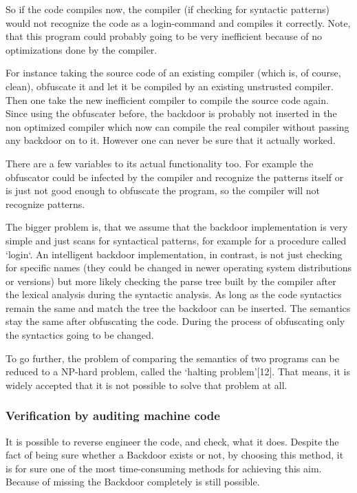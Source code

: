 \documentclass[a4paper, 12pt]{article}
\begin{document}
So if the code compiles now, the compiler (if checking for syntactic patterns) would not recognize the code as a login-command and compiles it correctly. Note, that this program could probably going to be very inefficient because of no optimizations done by the compiler.

For instance taking the source code of an existing compiler (which is, of course, clean), obfuscate it and let it be compiled by an existing unstrusted compiler.
Then one take the new inefficient compiler to compile the source code again. Since using the obfuscater before, the backdoor is probably not inserted in the non optimized compiler which now can compile the real compiler without passing any backdoor on to it.
However one can never be sure that it actually worked.

There are a few variables to its actual functionality too. For example the obfuscator could be infected by the compiler and recognize the patterns itself or is just not good enough to obfuscate the program, so the compiler will not recognize patterns.

The bigger problem is, that we assume that the backdoor implementation is very simple and just scans for syntactical patterns, for example for a procedure called `login`.
An intelligent backdoor implementation, in contrast, is not just checking for specific names (they could be changed in newer operating system distributions or versions) but more likely checking the parse tree built by the compiler after the lexical analysis during the syntactic analysis. As long as the code syntactics remain the same and match the tree the backdoor can be inserted. The semantics stay the same after obfuscating the code. During the process of obfuscating only the syntactics going to be changed.

To go further, the problem of comparing the semantics of two programs can be reduced to a NP-hard problem, called the `halting problem'[12].
That means, it is widely accepted that it is not possible to solve that problem at all.

\subsubsection{Verification by auditing machine code}

It is possible to reverse engineer the code, and check, what it does. Despite the fact of being sure whether a Backdoor exists or not, by choosing this method, it is for sure one of the most time-consuming methods for achieving this aim.
Because of missing the Backdoor completely is still possible.
\end{document}
